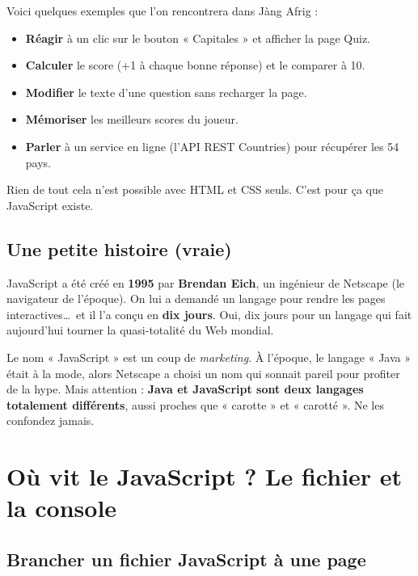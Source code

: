 \documentclass[11pt,a4paper]{article}
\begin{document}
Voici quelques exemples que l'on rencontrera dans Jàng Afrig :
\begin{itemize}[leftmargin=*,noitemsep]
  \item \textbf{Réagir} à un clic sur le bouton « Capitales » et afficher la page Quiz.
  \item \textbf{Calculer} le score (+1 à chaque bonne réponse) et le comparer à 10.
  \item \textbf{Modifier} le texte d'une question sans recharger la page.
  \item \textbf{Mémoriser} les meilleurs scores du joueur.
  \item \textbf{Parler} à un service en ligne (l'API REST Countries) pour récupérer les 54 pays.
\end{itemize}

Rien de tout cela n'est possible avec HTML et CSS seuls. C'est pour ça que JavaScript existe.

\subsection{Une petite histoire (vraie)}

JavaScript a été créé en \textbf{1995} par \textbf{Brendan Eich}, un ingénieur de Netscape (le navigateur de l'époque). On lui a demandé un langage pour rendre les pages interactives\ldots\ et il l'a conçu en \textbf{dix jours}. Oui, dix jours pour un langage qui fait aujourd'hui tourner la quasi-totalité du Web mondial.

\begin{infobox}
Le nom « JavaScript » est un coup de \emph{marketing}. À l'époque, le langage « Java » était à la mode, alors Netscape a choisi un nom qui sonnait pareil pour profiter de la hype. Mais attention : \textbf{Java et JavaScript sont deux langages totalement différents}, aussi proches que « carotte » et « carotté ». Ne les confondez jamais.
\end{infobox}

\section{Où vit le JavaScript ? Le fichier et la console}

\subsection{Brancher un fichier JavaScript à une page}
\end{document}
